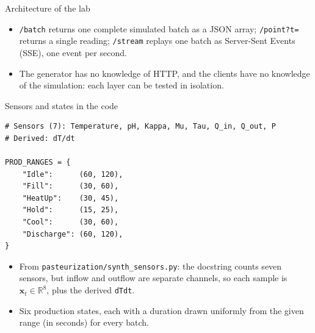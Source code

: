 \begin{frame}{Architecture of the lab}
\centering
{}
\vspace{0.6em}
\begin{itemize}\footnotesize
\item \texttt{/batch} returns one complete simulated batch as a JSON array; \texttt{/point?t=} returns a single reading; \texttt{/stream} replays one batch as Server-Sent Events (SSE), one event per second.
\item The generator has no knowledge of HTTP, and the clients have no knowledge of the simulation: each layer can be tested in isolation.
\end{itemize}
\coursefooter
\end{frame}

\begin{frame}[fragile]{Sensors and states in the code}
\begin{lstlisting}[style=coursepython]
# Sensors (7): Temperature, pH, Kappa, Mu, Tau, Q_in, Q_out, P
# Derived: dT/dt

PROD_RANGES = {
    "Idle":      (60, 120),
    "Fill":      (30, 60),
    "HeatUp":    (30, 45),
    "Hold":      (15, 25),
    "Cool":      (30, 60),
    "Discharge": (60, 120),
}
\end{lstlisting}
\begin{itemize}
\item From \texttt{pasteurization/synth\_sensors.py}: the docstring counts seven sensors, but inflow and outflow are separate channels, so each sample is $\mathbf{x}_t \in \mathbb{R}^{8}$, plus the derived \texttt{dTdt}.
\item Six production states, each with a duration drawn uniformly from the given range (in seconds) for every batch.
\end{itemize}
\coursefooter
\end{frame}

